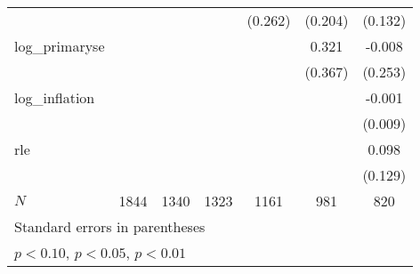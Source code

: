 {\begin{tabular}{l*{6}{c}}
            &                     &                     &                     &     (0.262)         &     (0.204)         &     (0.132)         \\
\addlinespace
log\_primaryse&                     &                     &                     &                     &       0.321         &      -0.008         \\
            &                     &                     &                     &                     &     (0.367)         &     (0.253)         \\
\addlinespace
log\_inflation&                     &                     &                     &                     &                     &      -0.001         \\
            &                     &                     &                     &                     &                     &     (0.009)         \\
\addlinespace
rle         &                     &                     &                     &                     &                     &       0.098         \\
            &                     &                     &                     &                     &                     &     (0.129)         \\
\midrule
\(N\)       &        1844         &        1340         &        1323         &        1161         &         981         &         820         \\
\bottomrule
\multicolumn{7}{l}{\footnotesize Standard errors in parentheses}\\
\multicolumn{7}{l}{\footnotesize \sym{*} \(p<0.10\), \sym{**} \(p<0.05\), \sym{***} \(p<0.01\)}\\
\end{tabular}
}
